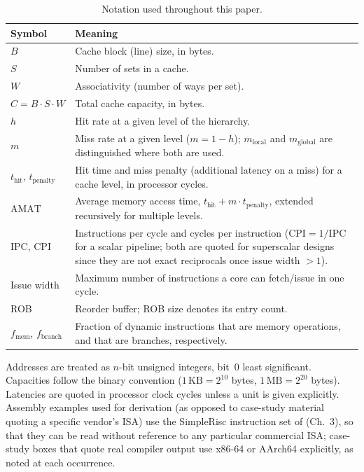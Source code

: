 \documentclass[11pt,a4paper]{report}
\begin{document}
\begin{table}[htbp]
\centering
\caption{Notation used throughout this paper.}
\label{tab:notation}
\begin{tabular}{@{}L{0.16\textwidth}L{0.78\textwidth}@{}}
\toprule
\textbf{Symbol} & \textbf{Meaning} \\
\midrule
$B$ & Cache block (line) size, in bytes. \\
$S$ & Number of sets in a cache. \\
$W$ & Associativity (number of ways per set). \\
$C = B \cdot S \cdot W$ & Total cache capacity, in bytes. \\
$h$ & Hit rate at a given level of the hierarchy. \\
$m$ & Miss rate at a given level ($m = 1-h$); $m_{\text{local}}$ and
  $m_{\text{global}}$ are distinguished where both are used. \\
$t_{\text{hit}}$, $t_{\text{penalty}}$ & Hit time and miss penalty (additional
  latency on a miss) for a cache level, in processor cycles. \\
$\text{AMAT}$ & Average memory access time, $t_{\text{hit}} + m \cdot
  t_{\text{penalty}}$, extended recursively for multiple levels. \\
IPC, CPI & Instructions per cycle and cycles per instruction
  ($\text{CPI} = 1/\text{IPC}$ for a scalar pipeline; both are quoted
  for superscalar designs since they are not exact reciprocals once
  issue width $> 1$). \\
Issue width & Maximum number of instructions a core can fetch/issue in
  one cycle. \\
ROB & Reorder buffer; ROB size denotes its entry count. \\
$f_{\text{mem}}$, $f_{\text{branch}}$ & Fraction of dynamic instructions
  that are memory operations, and that are branches, respectively. \\
\bottomrule
\end{tabular}
\end{table}

Addresses are treated as $n$-bit unsigned integers, bit~0 least
significant. Capacities follow the binary convention
($1\,\text{KB} = 2^{10}$ bytes, $1\,\text{MB} = 2^{20}$ bytes). Latencies
are quoted in processor clock cycles unless a unit is given explicitly.
Assembly examples used for derivation (as opposed to case-study material
quoting a specific vendor's ISA) use the SimpleRisc instruction set of
\cite{sarangi} (Ch.~3), so that they can be read without reference to any
particular commercial ISA; case-study boxes that quote real compiler
output use x86-64 or AArch64 explicitly, as noted at each occurrence.
\end{document}
